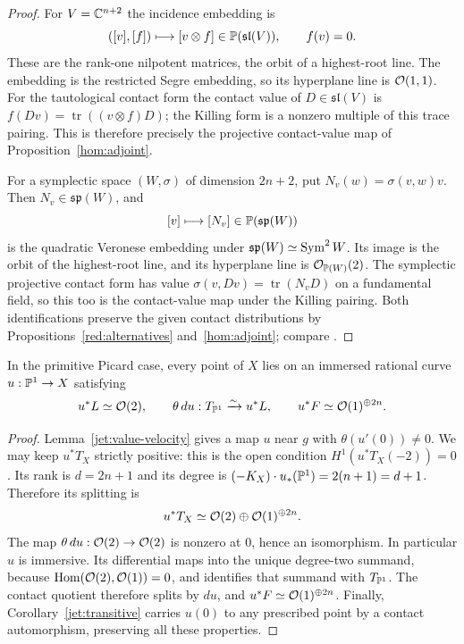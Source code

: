 \begin{proof}
For $V=\mathbb C^{n+2}$ the incidence embedding is
\[
 ([v],[f])\longmapsto[v\otimes f]\in\mathbb P(\mathfrak{sl}(V)),
 \qquad f(v)=0.
\]
These are the rank-one nilpotent matrices, the orbit of a
highest-root line. The embedding is the restricted Segre embedding,
so its hyperplane line is $\mathcal O(1,1)$. For the tautological contact
form the contact value of $D\in\mathfrak{sl}(V)$ is
$f(Dv)=\operatorname{tr}((v\otimes f)D)$; the Killing form is a
nonzero multiple of this trace pairing. This is therefore precisely
the projective contact-value map of Proposition~\ref{hom:adjoint}.

For a symplectic space $(W,\sigma)$ of dimension $2n+2$, put
$N_v(w)=\sigma(v,w)v$. Then $N_v\in\mathfrak{sp}(W)$, and
\[
 [v]\longmapsto[N_v]\in\mathbb P(\mathfrak{sp}(W))
\]
is the quadratic Veronese embedding under
$\mathfrak{sp}(W)\simeq\operatorname{Sym}^2W$. Its image is the orbit of the
highest-root line, and its hyperplane line is $\mathcal O_{\mathbb P(W)}(2)$.
The symplectic projective contact form has value
$\sigma(v,Dv)=\operatorname{tr}(N_vD)$ on a fundamental field,
so this too is the contact-value map under the Killing pairing.
Both identifications preserve the given contact distributions by
Propositions~\ref{red:alternatives} and~\ref{hom:adjoint}; compare
\cite[Examples~2.7]{Beauville1998}.
\end{proof}

\begin{corollary}\label{jet:good-curves}
In the primitive Picard case, every point of $X$ lies on an
immersed rational curve $u:\mathbb P^1\to X$ satisfying
\[
u^*L\simeq\mathcal O(2),\qquad
\theta\,du:T_{\mathbb P^1}\xrightarrow{\sim}u^*L,
\qquad u^*F\simeq\mathcal O(1)^{\oplus2n}.
\]
\end{corollary}

\begin{proof}
Lemma~\ref{jet:value-velocity} gives a map $u$ near $g$ with
$\theta(u'(0))\ne0$. We may keep $u^*T_X$ strictly positive:
this is the open condition $H^1(u^*T_X(-2))=0$.
Its rank is $d=2n+1$ and its degree is
$(-K_X)\cdot u_*(\mathbb P^1)=2(n+1)=d+1$. Therefore its splitting is
\[
u^*T_X\simeq\mathcal O(2)\oplus\mathcal O(1)^{\oplus2n}.
\]
The map $\theta\,du:\mathcal O(2)\to\mathcal O(2)$ is nonzero at $0$, hence
an isomorphism. In particular $u$ is immersive. Its differential
maps into the unique degree-two summand, because
$\operatorname{Hom}(\mathcal O(2),\mathcal O(1))=0$, and identifies that summand with
$T_{\mathbb P^1}$. The contact quotient therefore splits by $du$, and
$u^*F\simeq\mathcal O(1)^{\oplus2n}$. Finally,
Corollary~\ref{jet:transitive} carries $u(0)$ to any prescribed
point by a contact automorphism, preserving all these properties.
\end{proof}

